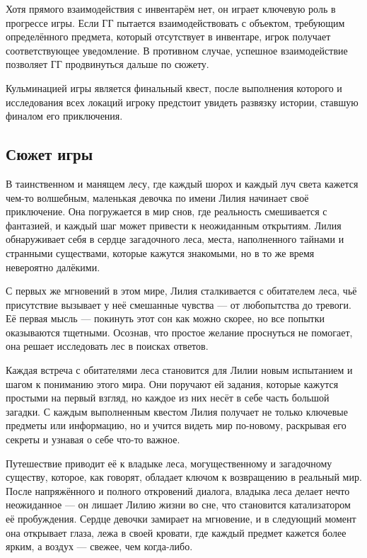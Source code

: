Хотя прямого взаимодействия с инвентарём нет, он играет ключевую роль в прогрессе игры. Если ГГ пытается взаимодействовать с объектом, требующим определённого предмета, который отсутствует в инвентаре, игрок получает соответствующее уведомление. В противном случае, успешное взаимодействие позволяет ГГ продвинуться дальше по сюжету.

Кульминацией игры является финальный квест, после выполнения которого и исследования всех локаций игроку предстоит увидеть развязку истории, ставшую финалом его приключения.

\subsection{Сюжет игры} %

В таинственном и манящем лесу, где каждый шорох и каждый луч света кажется чем-то волшебным, маленькая девочка по имени Лилия начинает своё приключение. Она погружается в мир снов, где реальность смешивается с фантазией, и каждый шаг может привести к неожиданным открытиям. Лилия обнаруживает себя в сердце загадочного леса, места, наполненного тайнами и странными существами, которые кажутся знакомыми, но в то же время невероятно далёкими.

С первых же мгновений в этом мире, Лилия сталкивается с обитателем леса, чьё присутствие вызывает у неё смешанные чувства — от любопытства до тревоги. Её первая мысль — покинуть этот сон как можно скорее, но все попытки оказываются тщетными. Осознав, что простое желание проснуться не помогает, она решает исследовать лес в поисках ответов.

Каждая встреча с обитателями леса становится для Лилии новым испытанием и шагом к пониманию этого мира. Они поручают ей задания, которые кажутся простыми на первый взгляд, но каждое из них несёт в себе часть большой загадки. С каждым выполненным квестом Лилия получает не только ключевые предметы или информацию, но и учится видеть мир по-новому, раскрывая его секреты и узнавая о себе что-то важное.

Путешествие приводит её к владыке леса, могущественному и загадочному существу, которое, как говорят, обладает ключом к возвращению в реальный мир. После напряжённого и полного откровений диалога, владыка леса делает нечто неожиданное — он лишает Лилию жизни во сне, что становится катализатором её пробуждения. Сердце девочки замирает на мгновение, и в следующий момент она открывает глаза, лежа в своей кровати, где каждый предмет кажется более ярким, а воздух — свежее, чем когда-либо.


